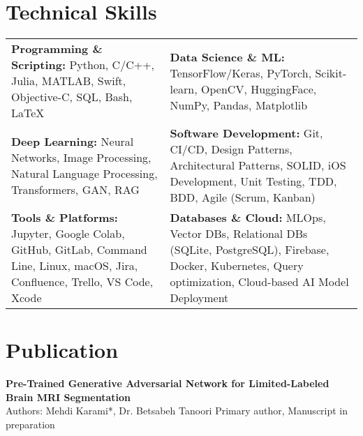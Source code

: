 \documentclass[letter,10pt]{article}
\newcommand{\customsquare}{\raisebox{0.25ex}{\scalebox{0.45}{$\blacksquare$}}}
\begin{document}
\section*{Technical Skills}
\begin{tabularx}{\textwidth}{@{}X@{\hspace{5mm}}X@{}}
\customsquare\hspace{2mm}\textbf{Programming \& Scripting:} Python, C/C++, Julia, MATLAB, Swift, Objective-C, SQL, Bash, LaTeX & 
\customsquare\hspace{2mm}\textbf{Data Science \& ML:} TensorFlow/Keras, PyTorch, Scikit-learn, OpenCV, HuggingFace, NumPy, Pandas, Matplotlib \\
\vspace{-1mm}
\customsquare\hspace{2mm}\textbf{Deep Learning:} Neural Networks, Image Processing, Natural Language Processing, Transformers, GAN, RAG &
\vspace{-1mm}
\customsquare\hspace{2mm}\textbf{Software Development:} Git, CI/CD, Design Patterns, Architectural Patterns, SOLID, iOS Development, Unit Testing, TDD, BDD, Agile (Scrum, Kanban) \\
\vspace{-1mm}
\customsquare\hspace{2mm}\textbf{Tools \& Platforms:} Jupyter, Google Colab, GitHub, GitLab, Command Line, Linux, macOS, Jira, Confluence, Trello, VS Code, Xcode &
\vspace{-1mm}
\customsquare\hspace{2mm}\textbf{Databases \& Cloud:} MLOps, Vector DBs, Relational DBs (SQLite, PostgreSQL), Firebase, Docker, Kubernetes, Query optimization, Cloud-based AI Model Deployment
\end{tabularx}

\section*{Publication}
\textbf{Pre-Trained Generative Adversarial Network for Limited-Labeled Brain MRI Segmentation} \\ [5pt]
Authors: Mehdi Karami*, Dr. Betsabeh Tanoori \hfill *Primary author, Manuscript in preparation \\ [-12pt]

\end{document}
